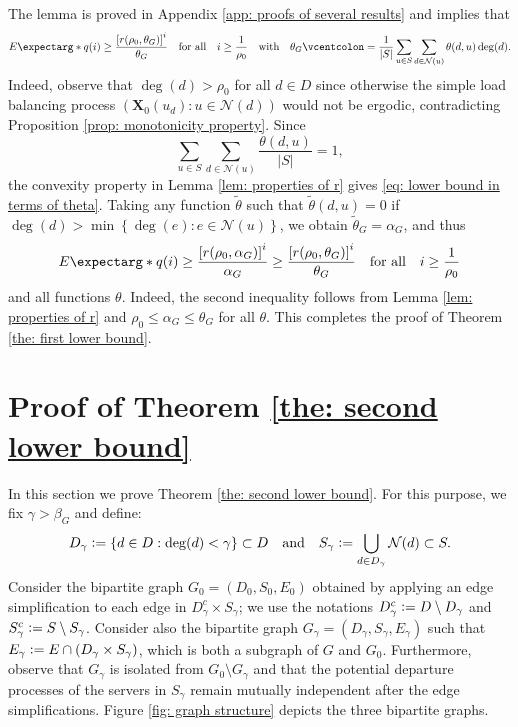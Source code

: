 \documentclass[a4paper, 12pt]{article}
\theoremstyle{definition}
\newcommand{\set}[2]{\left\{#1 : #2\right\}}
\newcommand{\sett}[2]{\left(#1 : #2\right)}
\newcommand{\defeq}{\vcentcolon=}
\newcommand{\bX}{\boldsymbol{X}}
\newcommand{\calN}{\mathcal{N}}
\newcommand{\expect}{E\expectarg}
\begin{document}
The lemma is proved in Appendix \ref{app: proofs of several results} and implies that
\begin{equation}
	\label{eq: lower bound in terms of theta}
	\expect*{q(i)} \geq \frac{\left[r(\rho_0, \theta_G)\right]^i}{\theta_G} \quad \text{for all} \quad i \geq \frac{1}{\rho_0} \quad \text{with} \quad \theta_G \defeq \frac{1}{|S|}\sum_{u \in S} \sum_{d \in \calN(u)} \theta(d, u) \deg(d).
\end{equation}
Indeed, observe that $\deg(d) > \rho_0$ for all $d \in D$ since otherwise the simple load balancing process $\sett{\bX_0(u_d)}{u \in \calN(d)}$ would not be ergodic, contradicting Proposition \ref{prop: monotonicity property}. Since
\begin{equation*}
	\sum_{u \in S} \sum_{d \in \calN(u)} \frac{\theta(d, u)}{|S|} = 1,
\end{equation*}
the convexity property in Lemma \ref{lem: properties of r} gives \eqref{eq: lower bound in terms of theta}. Taking any function $\tilde{\theta}$ such that $\tilde{\theta}(d, u) = 0$ if $\deg(d) > \min \set{\deg(e)}{e \in \calN(u)}$, we obtain $\tilde{\theta}_G = \alpha_G$, and thus
\begin{equation*}
	\expect*{q(i)} \geq \frac{\left[r(\rho_0, \alpha_G)\right]^i}{\alpha_G} \geq \frac{\left[r(\rho_0, \theta_G)\right]^i}{\theta_G} \quad \text{for all} \quad i \geq \frac{1}{\rho_0}
\end{equation*}
and all functions $\theta$. Indeed, the second inequality follows from Lemma \ref{lem: properties of r} and $\rho_0 \leq \alpha_G \leq \theta_G$ for all $\theta$. This completes the proof of Theorem \ref{the: first lower bound}.

\section{Proof of Theorem \ref{the: second lower bound}}
\label{sec: second lower bound}

In this section we prove Theorem \ref{the: second lower bound}. For this purpose, we fix $\gamma > \beta_G$ and define:
\begin{equation*}
	D_\gamma \defeq \set{d \in D}{\deg(d) < \gamma} \subset D \quad \text{and} \quad S_\gamma \defeq \bigcup_{d \in D_\gamma} \calN(d) \subset S.
\end{equation*}
Consider the bipartite graph $G_0 = (D_0, S_0, E_0)$ obtained by applying an edge simplification to each edge in $D_\gamma^c \times S_\gamma$; we use the notations $D_\gamma^c \defeq D \setminus D_\gamma$ and $S_\gamma^c \defeq S \setminus S_\gamma$. Consider also the bipartite graph $G_\gamma = (D_\gamma, S_\gamma, E_\gamma)$ such that $E_\gamma \defeq E \cap (D_\gamma \times S_\gamma)$, which is both a subgraph of $G$ and $G_0$. Furthermore, observe that $G_\gamma$ is isolated from $G_0 \setminus G_\gamma$ and that the potential departure processes of the servers in $S_\gamma$ remain mutually independent after the edge simplifications. Figure \ref{fig: graph structure} depicts the three bipartite graphs.
\end{document}
